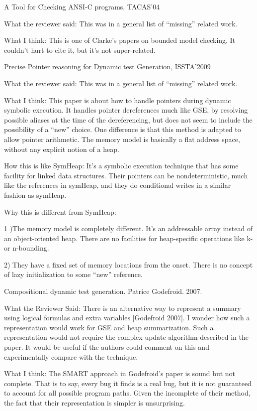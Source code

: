 {A Tool for Checking ANSI-C programs, TACAS'04

What the reviewer said: This was in a general list of “missing” related work.

What I think: This is one of Clarke’s papers on bounded model checking. It couldn’t hurt to cite it, but it’s not super-related.

Precise Pointer reasoning for Dynamic test Generation, ISSTA'2009

What the reviewer said: This was in a general list of “missing” related work.

What I think: This paper is about how to handle pointers during dynamic symbolic execution. It handles pointer dereferences much like GSE, by resolving possible aliases at the time of the dereferencing, but does not seem to include the possibility of a “new” choice. One difference is that this method is adapted to allow pointer arithmetic. The memory model is basically a flat address space, without any explicit notion of a heap.

How this is like SymHeap: It’s a symbolic execution technique that has some facility for linked data structures. Their pointers can be nondeterministic, much like the references in symHeap, and they do conditional writes in a similar fashion as symHeap.

Why this is different from SymHeap:

1 )The memory model is completely different. It’s an addressable array instead of an object-oriented heap. There are no facilities for heap-specific operations like k- or n-bounding. 

2) They have a fixed set of memory locations from the onset. There is no concept of lazy initialization to some “new” reference.

Compositional dynamic test generation. Patrice Godefroid. 2007.

What the Reviewer Said: There is an alternative way to represent a summary using logical
formulas and extra variables [Godefroid 2007]. I wonder how such a
representation would work for GSE and heap summarization. Such a
representation would not require the complex update algorithm
described in the paper. It would be useful if the authors could
comment on this and experimentally compare with the technique.

What I think: The SMART approach in Godefroid’s paper is sound but not complete. That is to say, every bug it finds is a real bug, but it is not guaranteed to account for all possible program paths. Given the incomplete of their method, the fact that their representation is simpler is unsurprising.

}
